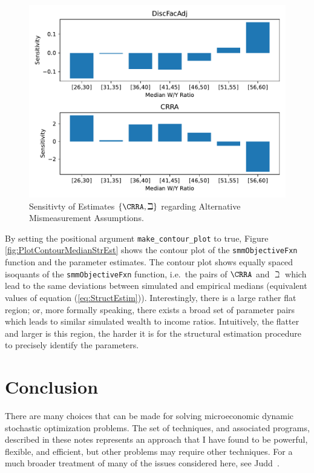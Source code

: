 \documentclass[titlepage, headings=optiontotocandhead]{\econtex}
\begin{document}
\hypertarget{PlotSensitivityMeasure}{}
\begin{figure}
  \includegraphics[width=6in]{./Figures/Sensitivity.pdf}
  \caption{Sensitivty of Estimates $\{\CRRA,{\beth}\}$ regarding Alternative Mismeasurement Assumptions.}
  \label{fig:PlotSensitivityMeasure}
\end{figure}

By setting the positional argument
\texttt{make\_contour\_plot} to true, Figure \ref{fig:PlotContourMedianStrEst} shows
the contour plot of the \texttt{smmObjectiveFxn} function
and the parameter estimates. The contour plot shows equally spaced
isoquants of the \texttt{smmObjectiveFxn} function,
i.e.\ the pairs of $\CRRA$ and ${\beth}$ which lead to the same
deviations between simulated and empirical medians (equivalent values
of equation (\ref{eq:StructEstim})). Interestingly, there is a large rather flat region; or, more formally speaking,
there exists a broad set of parameter pairs which leads to similar
simulated wealth to income ratios. Intuitively, the flatter and larger
is this region, the harder it is for the structural estimation
procedure to precisely identify the parameters.

\section{Conclusion}

There are many choices that can be made for solving microeconomic dynamic stochastic optimization problems.  
The set of techniques, and associated programs, described in these notes represents an approach that I have found to be powerful, flexible, and efficient, but other problems may require other techniques.  For a much broader treatment of many of the issues considered here, see Judd~\citeyearpar{judd:book}.
\end{document}
